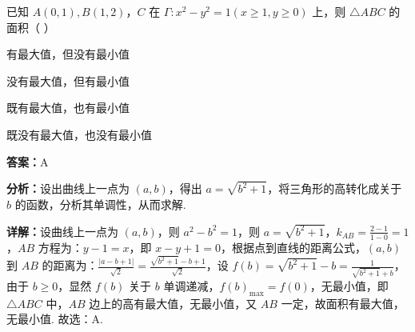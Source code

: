 \begin{question}[points=5]
已知 $A(0,1), B(1,2)$，$C$ 在 $\Gamma: x^2 - y^2 = 1 (x \geq 1, y \geq 0)$ 上，则 $\triangle ABC$ 的面积（ ）
\begin{choices}
  \item 有最大值，但没有最小值
  \item 没有最大值，但有最小值
  \item 既有最大值，也有最小值
  \item 既没有最大值，也没有最小值
\end{choices}
\begin{solution}
\textbf{答案：}A

\textbf{分析：}设出曲线上一点为 $(a, b)$，得出 $a = \sqrt{b^2 + 1}$，将三角形的高转化成关于 $b$ 的函数，分析其单调性，从而求解.

\textbf{详解：}设曲线上一点为 $(a, b)$，则 $a^2 - b^2 = 1$，则 $a = \sqrt{b^2 + 1}$，$k_{AB} = \frac{2-1}{1-0} = 1$，$AB$ 方程为：$y-1 = x$，即 $x - y + 1 = 0$，根据点到直线的距离公式，$(a, b)$ 到 $AB$ 的距离为：$\frac{|a - b + 1|}{\sqrt{2}} = \frac{\sqrt{b^2 + 1} - b + 1}{\sqrt{2}}$，设 $f(b) = \sqrt{b^2 + 1} - b = \frac{1}{\sqrt{b^2 + 1} + b}$，由于 $b \geq 0$，显然 $f(b)$ 关于 $b$ 单调递减，$f(b)_{\max} = f(0)$，无最小值，即 $\triangle ABC$ 中，$AB$ 边上的高有最大值，无最小值，又 $AB$ 一定，故面积有最大值，无最小值. 故选：A.
\end{solution}
\end{question}

